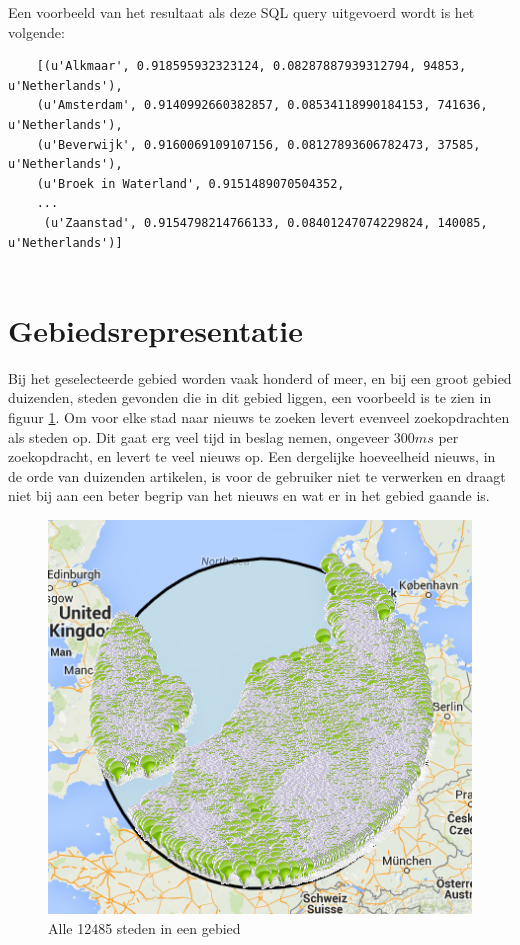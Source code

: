\documentclass[twoside,openright]{uva-bachelor-thesis}
\begin{document}
	Een voorbeeld van het resultaat als deze SQL query uitgevoerd wordt is het volgende:
	\begin{verbatim}
	[(u'Alkmaar', 0.918595932323124, 0.08287887939312794, 94853, u'Netherlands'), 
	(u'Amsterdam', 0.9140992660382857, 0.08534118990184153, 741636, u'Netherlands'), 
	(u'Beverwijk', 0.9160069109107156, 0.08127893606782473, 37585, u'Netherlands'), 
	(u'Broek in Waterland', 0.9151489070504352,
	...
	 (u'Zaanstad', 0.9154798214766133, 0.08401247074229824, 140085, u'Netherlands')]
	
	\end{verbatim}
	\section{Gebiedsrepresentatie}
		\label{sec:rep}
		Bij het geselecteerde gebied worden vaak honderd of meer, en bij een groot gebied duizenden, steden gevonden die in dit gebied liggen, een voorbeeld is te zien in figuur \ref{fig:without}. Om voor elke stad naar nieuws te zoeken levert evenveel zoekopdrachten als steden op. Dit gaat erg veel tijd in beslag nemen, ongeveer $300ms$ per zoekopdracht, en levert te veel nieuws op. Een dergelijke hoeveelheid nieuws, in de orde van duizenden artikelen, is voor de gebruiker niet te verwerken en draagt niet bij aan een beter begrip van het nieuws en wat er in het gebied gaande is.
		\begin{figure}[!htb]
			\centering
			\includegraphics[scale=1.0]{./img/area_wo_algo.png}
			\caption{Alle 12485 steden in een gebied}
			\label{fig:without}
		\end{figure}
\end{document}
